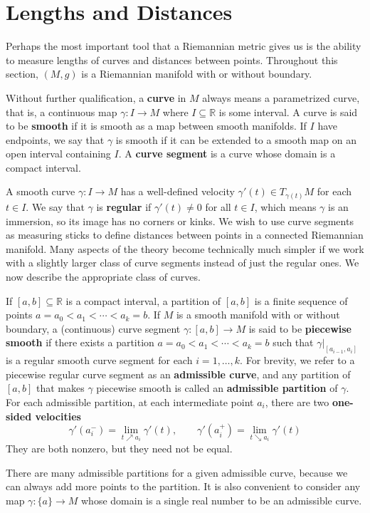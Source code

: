 \documentclass[../main.tex]{subfiles}
\begin{document}
\section{Lengths and Distances}
Perhaps the most important tool that a Riemannian metric gives us is the ability to measure lengths of curves and distances between points. Throughout this section, $(M, g)$ is a Riemannian manifold with or without boundary.

Without further qualification, a \textbf{curve} in $M$ always means a parametrized curve, that is, a continuous map $\gamma: I \to M$ where $I \subseteq \mathbb{R}$ is some interval. A curve is said to be \textbf{smooth} if it is smooth as a map between smooth manifolds. If $I$ have endpoints, we say that $\gamma$ is smooth if it can be extended to a smooth map on an open interval containing $I$. A \textbf{curve segment} is a curve whose domain is a compact interval.

A smooth curve $\gamma: I \to M$ has a well-defined velocity $\gamma'(t) \in T_{\gamma(t)}M$ for each $t \in I$. We say that $\gamma$ is \textbf{regular} if $\gamma'(t) \neq 0$ for all $t \in I$, which means $\gamma$ is an immersion, so its image has no corners or kinks. We wish to use curve segments as measuring sticks to define distances between points in a connected Riemannian manifold. Many aspects of the theory become technically much simpler if we work with a slightly larger class of curve segments instead of just the regular ones. We now describe the appropriate class of curves.

If $[a, b] \subseteq \mathbb{R}$ is a compact interval, a partition of $[a, b]$ is a finite sequence of points $a = a_0 < a_1 < \cdots < a_k = b$. If $M$ is a smooth manifold with or without boundary, a (continuous) curve segment $\gamma: [a, b] \to M$ is said to be \textbf{piecewise smooth} if there exists a partition $a = a_0 < a_1 < \cdots < a_k = b$ such that $\gamma|_{[a_{i-1}, a_i]}$ is a regular smooth curve segment for each $i = 1, \ldots, k$. For brevity, we refer to a piecewise regular curve segment as an \textbf{admissible curve}, and any partition of $[a, b]$ that makes $\gamma$ piecewise smooth is called an \textbf{admissible partition} of $\gamma$. For each admissible partition, at each intermediate point $a_i$, there are two \textbf{one-sided velocities}
\begin{equation}
	\gamma'(a_i^-) = \lim_{t \nearrow a_i} \gamma'(t), \qquad \gamma'(a_i^+) = \lim_{t \searrow a_i} \gamma'(t)
\end{equation}
They are both nonzero, but they need not be equal.
\begin{remark}
	There are many admissible partitions for a given admissible curve, because we can always add more points to the partition. It is also convenient to consider any map $\gamma: \{a\} \to M$ whose domain is a single real number to be an admissible curve.
\end{remark}
\end{document}
